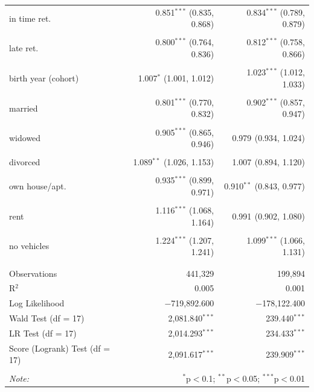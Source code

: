 \documentclass[a4paper,10pt,oneside,english]{article}
\begin{document}
\begin{table}[H]
\begin{tabular}{@{\extracolsep{5pt}}lrr}
		in time ret. & 0.851$^{***}$ (0.835, 0.868) & 0.834$^{***}$ (0.789, 0.879) \\ 
		& & \\ 
		late ret. & 0.800$^{***}$ (0.764, 0.836) & 0.812$^{***}$ (0.758, 0.866) \\ 
		& & \\ 
		birth year (cohort) & 1.007$^{*}$ (1.001, 1.012) & 1.023$^{***}$ (1.012, 1.033) \\ 
		& & \\ 
		married & 0.801$^{***}$ (0.770, 0.832) & 0.902$^{***}$ (0.857, 0.947) \\ 
		& & \\ 
		widowed & 0.905$^{***}$ (0.865, 0.946) & 0.979$^{}$ (0.934, 1.024) \\ 
		& & \\ 
		divorced & 1.089$^{**}$ (1.026, 1.153) & 1.007$^{}$ (0.894, 1.120) \\ 
		& & \\ 
		own house/apt. & 0.935$^{***}$ (0.899, 0.971) & 0.910$^{**}$ (0.843, 0.977) \\ 
		& & \\ 
		rent & 1.116$^{***}$ (1.068, 1.164) & 0.991$^{}$ (0.902, 1.080) \\ 
		& & \\ 
		no vehicles & 1.224$^{***}$ (1.207, 1.241) & 1.099$^{***}$ (1.066, 1.131) \\ 
		& & \\ 
		\hline \\[-1.8ex] 
		Observations & 441,329 & 199,894 \\ 
		R$^{2}$ & 0.005 & 0.001 \\ 
		Log Likelihood & $-$719,892.600 & $-$178,122.400 \\ 
		Wald Test (df = 17) & 2,081.840$^{***}$ & 239.440$^{***}$ \\ 
		LR Test (df = 17) & 2,014.293$^{***}$ & 234.433$^{***}$ \\ 
		Score (Logrank) Test (df = 17) & 2,091.617$^{***}$ & 239.909$^{***}$ \\ 
		\hline 
		\hline \\[-1.8ex] 
		\textit{Note:}  & \multicolumn{2}{r}{$^{*}$p$<$0.1; $^{**}$p$<$0.05; $^{***}$p$<$0.01} \\ 
	\end{tabular} 
\end{table} 
%
\end{document}
